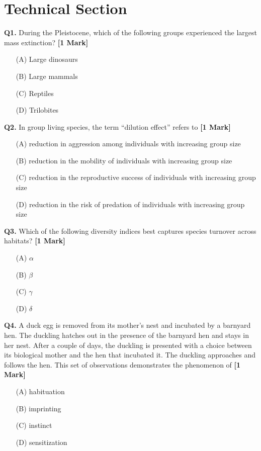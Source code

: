 \documentclass[11pt]{article}
\newcommand{\questiona}[2]{
    \noindent\textbf{Q#2.} #1 \hfill \textbf{[1 Mark]}
}
\begin{document}
\section*{Technical Section}

\questiona{During the Pleistocene, which of the following groups experienced the largest mass extinction?}{1}
\begin{enumerate}
    \item[(A)] Large dinosaurs
    \item[(B)] Large mammals
    \item[(C)] Reptiles
    \item[(D)] Trilobites
\end{enumerate}
\vspace{0.5cm}

\questiona{In group living species, the term ``dilution effect'' refers to}{2}
\begin{enumerate}
    \item[(A)] reduction in aggression among individuals with increasing group size
    \item[(B)] reduction in the mobility of individuals with increasing group size
    \item[(C)] reduction in the reproductive success of individuals with increasing group size
    \item[(D)] reduction in the risk of predation of individuals with increasing group size
\end{enumerate}
\vspace{0.5cm}

\questiona{Which of the following diversity indices best captures species turnover across habitats?}{3}
\begin{enumerate}
    \item[(A)] \( \alpha \)
    \item[(B)] \( \beta \)
    \item[(C)] \( \gamma \)
    \item[(D)] \( \delta \)
\end{enumerate}
\vspace{0.5cm}

\questiona{A duck egg is removed from its mother’s nest and incubated by a barnyard hen. The duckling hatches out in the presence of the barnyard hen and stays in her nest. After a couple of days, the duckling is presented with a choice between its biological mother and the hen that incubated it. The duckling approaches and follows the hen. This set of observations demonstrates the phenomenon of}{4}
\begin{enumerate}
    \item[(A)] habituation
    \item[(B)] imprinting
    \item[(C)] instinct
    \item[(D)] sensitization
\end{enumerate}
\vspace{0.5cm}
\end{document}

